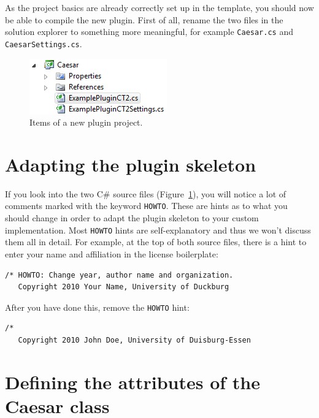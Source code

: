 As the project basics are already correctly set up in the template, you should now be able to compile the new plugin. First of all, rename the two files in the solution explorer to something more meaningful, for example \texttt{Caesar.cs} and \texttt{CaesarSettings.cs}.

\begin{figure}[h!]
	\centering
		\includegraphics{figures/caesar_project.png}
	\caption{Items of a new plugin project.}
	\label{fig:caesar_project}
\end{figure}

\section{Adapting the plugin skeleton}
\label{AdaptingThePluginSkeleton}

If you look into the two C\# source files (Figure~\ref{fig:caesar_project}), you will notice a lot of comments marked with the keyword \texttt{HOWTO}. These are hints as to what you should change in order to adapt the plugin skeleton to your custom implementation. Most \texttt{HOWTO} hints are self-explanatory and thus we won't discuss them all in detail. For example, at the top of both source files, there is a hint to enter your name and affiliation in the license boilerplate:

\begin{lstlisting}
/* HOWTO: Change year, author name and organization.
   Copyright 2010 Your Name, University of Duckburg

\end{lstlisting}

After you have done this, remove the \texttt{HOWTO} hint:

\begin{lstlisting}
/*
   Copyright 2010 John Doe, University of Duisburg-Essen

\end{lstlisting}

\section{Defining the attributes of the Caesar class}
\label{sec:DefiningTheAttributesOfTheCaesarClass}


